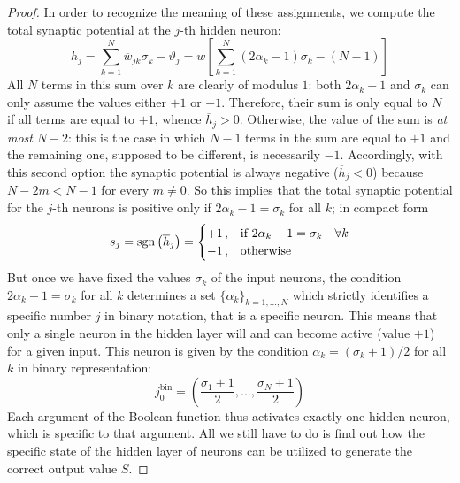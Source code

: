 \begin{proof}
In order to recognize the meaning of these assignments, we compute the total synaptic potential at the $j$-th hidden neuron:
\begin{equation}
\overline{h}_j=\sum_{k=1}^{N}\overline{w}_{jk}\sigma_k-\overline{\vartheta}_j=w\left[\sum_{k=1}^{N}(2\alpha_k-1)\sigma_k-(N-1)\right]
\end{equation}
All $N$ terms in this sum over $k$ are clearly of modulus $1$: both $2\alpha_k-1$ and $\sigma_k$ can only assume the values either $+1$ or $-1$. Therefore, their sum is only equal to $N$ if all terms are equal to $+1$, whence $\overline{h}_j>0$. Otherwise, the value of the sum is \emph{at most} $N-2$: this is the case in which $N-1$ terms in the sum are equal to $+1$ and the remaining one, supposed to be different, is necessarily $-1$. Accordingly, with this second option the synaptic potential is always negative ($\overline{h}_j<0$) because $N-2m<N-1$ for every $m\neq0$. So this implies that the total synaptic potential for the $j$-th neurons is positive only if $2\alpha_k-1=\sigma_k$ for all $k$; in compact form
\begin{equation}\label{sjActive}
s_j=\operatorname{sgn}{\bigl(\overline{h}_j\bigr)}=\begin{cases}
+1\,,&\text{if $2\alpha_k-1=\sigma_k\quad\forall k$}\\
-1\,,&\text{otherwise}
\end{cases}
\end{equation}
But once we have fixed the values $\sigma_k$ of the input neurons, the condition $2\alpha_k-1=\sigma_k$ for all $k$ determines a set ${\{\alpha_k\}}_{k=1,\ldots,N}$ which strictly identifies a specific number $j$ in binary notation, that is a specific neuron.
This means that only a single neuron in the hidden layer will and can become active (value $+1$) for a given input. This neuron is given by the condition $\alpha_k=(\sigma_k+1)/2$ for all $k$ in binary representation:
\begin{equation}
j_0^{\text{bin}}=\left(\frac{\sigma_1+1}{2},\ldots,\frac{\sigma_N+1}{2}\right)
\end{equation}
Each argument of the Boolean function thus activates exactly one hidden neuron, which is specific to that argument. All we still have to do is find out how the specific state of the hidden layer of neurons can be utilized to generate the correct output value $S$.


\end{proof}
